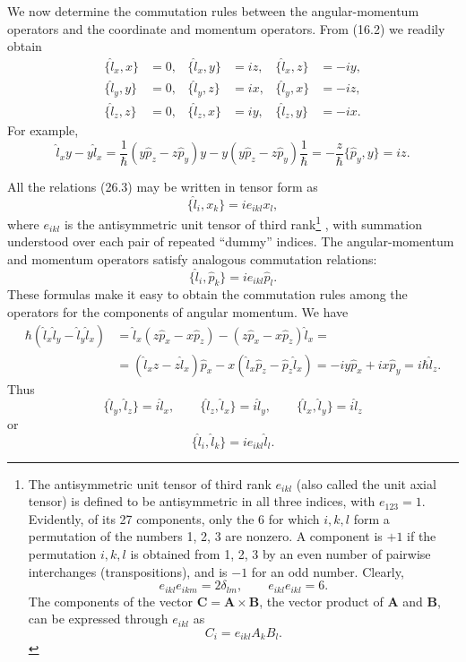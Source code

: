 We now determine the commutation rules between the angular-momentum operators
and the coordinate and momentum operators. From (16.2) we readily obtain
\begin{equation}
  \begin{aligned}
  \{\hat l_x,x\}&=0,&
  \{\hat l_x,y\}&=iz,&
  \{\hat l_x,z\}&=-iy,\\
  \{\hat l_y,y\}&=0,&
  \{\hat l_y,z\}&=ix,&
  \{\hat l_y,x\}&=-iz,\\
  \{\hat l_z,z\}&=0,&
  \{\hat l_z,x\}&=iy,&
  \{\hat l_z,y\}&=-ix.
  \end{aligned}
  \tag{26.3}
\end{equation}
For example,
\[
  \hat l_xy-y\hat l_x
  =\frac1\hbar(y\hat p_z-z\hat p_y)y
   -y(y\hat p_z-z\hat p_y)\frac1\hbar
  =-\frac z\hbar\{\hat p_y,y\}=iz.
\]

All the relations (26.3) may be written in tensor form as
\begin{equation}
  \{\hat l_i,x_k\}=ie_{ikl}x_l,
  \tag{26.4}
\end{equation}
where $e_{ikl}$ is the antisymmetric unit tensor of third
rank\footnote{The antisymmetric unit tensor of third rank $e_{ikl}$ (also
called the unit axial tensor) is defined to be antisymmetric in all three
indices, with $e_{123}=1$. Evidently, of its 27 components, only the 6 for
which $i,k,l$ form a permutation of the numbers 1, 2, 3 are nonzero. A
component is $+1$ if the permutation $i,k,l$ is obtained from 1, 2, 3 by an
even number of pairwise interchanges (transpositions), and is $-1$ for an odd
number. Clearly,
\[
  e_{ikl}e_{ikm}=2\delta_{lm},\qquad e_{ikl}e_{ikl}=6.
\]
The components of the vector $\mathbf C=\mathbf A\times\mathbf B$, the vector
product of $\mathbf A$ and $\mathbf B$, can be expressed through $e_{ikl}$ as
\[
  C_i=e_{ikl}A_kB_l.
\]}
, with summation understood over each pair of repeated ``dummy'' indices.
The angular-momentum and momentum operators satisfy analogous commutation
relations:
\begin{equation}
  \{\hat l_i,\hat p_k\}=ie_{ikl}\hat p_l.
  \tag{26.5}
\end{equation}
These formulas make it easy to obtain the commutation rules among the
operators for the components of angular momentum. We have
\[
  \begin{aligned}
  \hbar(\hat l_x\hat l_y-\hat l_y\hat l_x)
    &=\hat l_x(z\hat p_x-x\hat p_z)
      -(z\hat p_x-x\hat p_z)\hat l_x={}\\
    &=(\hat l_xz-z\hat l_x)\hat p_x
      -x(\hat l_x\hat p_z-\hat p_z\hat l_x)
      =-iy\hat p_x+ix\hat p_y=i\hbar\hat l_z.
  \end{aligned}
\]
Thus
\begin{equation}
  \{\hat l_y,\hat l_z\}=i\hat l_x,\qquad
  \{\hat l_z,\hat l_x\}=i\hat l_y,\qquad
  \{\hat l_x,\hat l_y\}=i\hat l_z
  \tag{26.6}
\end{equation}
or
\begin{equation}
  \{\hat l_i,\hat l_k\}=ie_{ikl}\hat l_l.
  \tag{26.7}
\end{equation}

